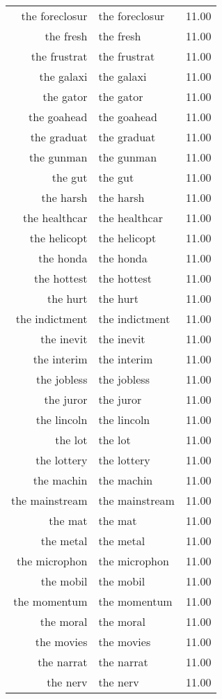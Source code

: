 \begin{table}[ht]
\begin{tabular}{rlr}
  the foreclosur & the foreclosur & 11.00 \\ 
  the fresh & the fresh & 11.00 \\ 
  the frustrat & the frustrat & 11.00 \\ 
  the galaxi & the galaxi & 11.00 \\ 
  the gator & the gator & 11.00 \\ 
  the goahead & the goahead & 11.00 \\ 
  the graduat & the graduat & 11.00 \\ 
  the gunman & the gunman & 11.00 \\ 
  the gut & the gut & 11.00 \\ 
  the harsh & the harsh & 11.00 \\ 
  the healthcar & the healthcar & 11.00 \\ 
  the helicopt & the helicopt & 11.00 \\ 
  the honda & the honda & 11.00 \\ 
  the hottest & the hottest & 11.00 \\ 
  the hurt & the hurt & 11.00 \\ 
  the indictment & the indictment & 11.00 \\ 
  the inevit & the inevit & 11.00 \\ 
  the interim & the interim & 11.00 \\ 
  the jobless & the jobless & 11.00 \\ 
  the juror & the juror & 11.00 \\ 
  the lincoln & the lincoln & 11.00 \\ 
  the lot & the lot & 11.00 \\ 
  the lottery & the lottery & 11.00 \\ 
  the machin & the machin & 11.00 \\ 
  the mainstream & the mainstream & 11.00 \\ 
  the mat & the mat & 11.00 \\ 
  the metal & the metal & 11.00 \\ 
  the microphon & the microphon & 11.00 \\ 
  the mobil & the mobil & 11.00 \\ 
  the momentum & the momentum & 11.00 \\ 
  the moral & the moral & 11.00 \\ 
  the movies & the movies & 11.00 \\ 
  the narrat & the narrat & 11.00 \\ 
  the nerv & the nerv & 11.00 \\ 

\end{tabular}
\end{table}
